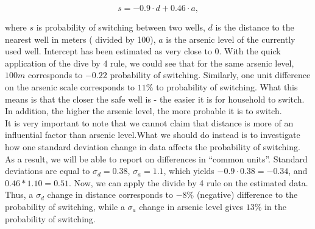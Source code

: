 \documentclass{article}
\begin{document}
\begin{equation}
 s = -0.9 \cdot d + 0.46 \cdot a,
\end{equation}

where $s$ is probability of switching between two wells, $d$ is the distance to the nearest well in meters ( divided by 100), $a$ is the arsenic level of the currently used well. Intercept has been estimated as very close to $0$. With the quick application of the dive by 4 rule, we could see that for the same arsenic level, $100m$ corresponds to $-0.22$ probability of switching. Similarly, one unit difference on the arsenic scale corresponds to $11\%$ to probability of switching. What this means is that the closer the safe well is - the easier it is for household to switch. In addition, the higher the arsenic level, the more probable it is to switch.
\\
\indent It is very important to note that we cannot claim that distance is more of an influential factor than arsenic level.What we should do instead is to investigate how one standard deviation change in data affects the probability of switching. As a result, we will be able to report on differences in ``common units''. Standard deviations are equal to $ \sigma_d = 0.38$, $\sigma_a = 1.1$, which yields  $-0.9 \cdot 0.38 = -0.34$, and $0.46*1.10=0.51$. Now, we can apply the divide by 4 rule on the estimated data. Thus, a $\sigma_d$ change in distance corresponds to $-8\%$ (negative) difference to the probability of switching, while a $\sigma_a$ change in arsenic level gives $13\%$ in the probability of switching.
\end{document}
